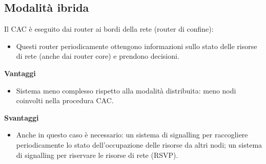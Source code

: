 \subsection{Modalità ibrida}
Il CAC è eseguito dai router ai bordi della rete (router di confine):
\begin{itemize}
	\item Questi router periodicamente ottengono informazioni sullo stato delle risorse di rete (anche dai router core) e prendono decisioni.
\end{itemize}\noindent
\textbf{Vantaggi}
\begin{itemize}
	\item Sistema meno complesso rispetto alla modalità distribuita: meno nodi coinvolti nella procedura CAC.
\end{itemize}
\textbf{Svantaggi}
\begin{itemize}
	\item Anche in questo caso è necessario: un sistema di signalling per raccogliere periodicamente lo stato dell'occupazione delle risorse da altri nodi; un sistema di signalling per riservare le risorse di rete (RSVP).
\end{itemize}

